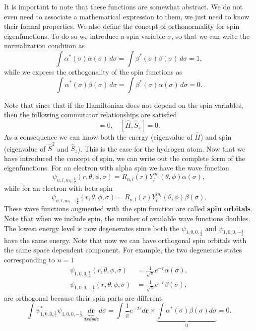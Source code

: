 \documentclass[../Main/chem331-notes.tex]{subfiles}
\begin{document}
It is important to note that these functions are somewhat abstract. We do not even need to associate a mathematical expression to them, we just need to know their formal properties.
We also define the concept of orthonormality for spin eigenfunctions.
To do so we introduce a spin variable $\sigma$, so that we can write the normalization condition as
\begin{equation}
\int \alpha^*(\sigma) \alpha(\sigma) \, d\sigma = \int \beta^*(\sigma) \beta(\sigma) \, d\sigma  = 1,
\end{equation}
while we express the orthogonality of the spin functions as
\begin{equation}
\int \alpha^*(\sigma) \beta(\sigma) \, d\sigma = \int \beta^*(\sigma) \alpha(\sigma) \, d\sigma  = 0.
\end{equation}

Note that since that if the Hamiltonian does not depend on the spin variables, then the following commutator relationships are satisfied
\begin{equation}
[\hat{H}, \hat{S}^2] = 0, \quad [\hat{H}, \hat{S}_z] = 0.
\end{equation}
As a consequence we can know both the energy (eigenvalue of $\hat{H}$) and spin (eigenvalue of $\hat{S}^2$ and $\hat{S}_z$). 
This is the case for the hydrogen atom. Now that we have introduced the concept of spin, we can write out the complete form of the eigenfunctions.
For an electron with alpha spin we have the wave function
\begin{equation}
\psi_{n,l,m_l,\frac{1}{2}}(r,\theta,\phi,\sigma) = R_{n,l}(r) Y_l^{m_l}(\theta,\phi) \alpha(\sigma),
\end{equation}
while for an electron with beta spin
\begin{equation}
\psi_{n,l,m_l,-\frac{1}{2}}(r,\theta,\phi,\sigma) = R_{n,l}(r) Y_l^{m_l}(\theta,\phi) \beta(\sigma).
\end{equation}
These wave functions augmented with the spin function are called \textbf{spin orbitals}.
Note that when we include spin, the number of available wave functions doubles.
The lowest energy level is now degenerates since both the $\psi_{1,0,0,\frac{1}{2}}$ and $\psi_{1,0,0,-\frac{1}{2}}$ have the same energy.
Note that now we can have orthogonal spin orbitals with the same space dependent component.
For example, the two degenerate states corresponding to $n = 1$
\begin{align}
\psi_{1,0,0,\frac{1}{2}}(r,\theta,\phi,\sigma) & = \frac{1}{\sqrt{\pi}} e^{-r} \alpha(\sigma), \\
\psi_{1,0,0,-\frac{1}{2}}(r,\theta,\phi,\sigma) & = \frac{1}{\sqrt{\pi}} e^{-r} \beta(\sigma),
\end{align}
are orthogonal because their spin parts are different
\begin{equation}
\int \psi_{1,0,0,\frac{1}{2}}^* \psi_{1,0,0,-\frac{1}{2}} \, \underbrace{d\mathbf{r}}_{dx dy dz} d\sigma = 
\int \frac{1}{\pi} e^{-2r} d\mathbf{r} \times  \underbrace{\int  \alpha^*(\sigma)\beta(\sigma) d\sigma}_{0}  = 0.
\end{equation}
\end{document}
